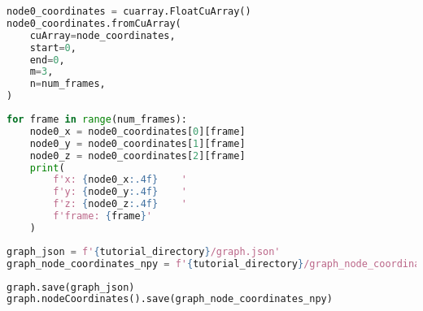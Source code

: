 \documentclass{article}
\begin{document}
    \begin{lstlisting}[language=Python]
node0_coordinates = cuarray.FloatCuArray()
node0_coordinates.fromCuArray(
    cuArray=node_coordinates,
    start=0,
    end=0,
    m=3,
    n=num_frames,
)
    \end{lstlisting}

    \begin{lstlisting}[language=Python]
for frame in range(num_frames):
    node0_x = node0_coordinates[0][frame]
    node0_y = node0_coordinates[1][frame]
    node0_z = node0_coordinates[2][frame]
    print(
        f'x: {node0_x:.4f}    '
        f'y: {node0_y:.4f}    '
        f'z: {node0_z:.4f}    '
        f'frame: {frame}'
    )
    \end{lstlisting}

    \begin{lstlisting}[language=Python]
graph_json = f'{tutorial_directory}/graph.json'
graph_node_coordinates_npy = f'{tutorial_directory}/graph_node_coordinates.npy'
    \end{lstlisting}
    \begin{lstlisting}[language=Python]
graph.save(graph_json)
graph.nodeCoordinates().save(graph_node_coordinates_npy)
    \end{lstlisting}
\end{document}
